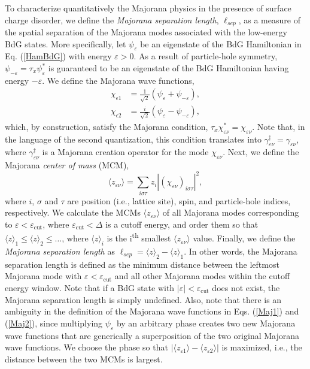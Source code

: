 \documentclass[aps,prmaterials,twocolumn,superscriptaddress,longbibliography]{revtex4-2}
\begin{document}
To characterize quantitatively the Majorana physics in the presence of surface charge disorder, we define the \textit{Majorana separation length}, $\ell_{sep}$, as a measure of the spatial separation of the Majorana modes associated with the low-energy BdG states. More specifically, let $\psi_\varepsilon$ be an eigenstate of the BdG Hamiltonian in Eq. (\ref{HamBdG}) with energy $\varepsilon > 0$. As a result of particle-hole symmetry, $\psi_{-\varepsilon} = \tau_x \psi_{\varepsilon}^*$ is guaranteed to be an eigenstate of the BdG Hamiltonian having energy $-\varepsilon$. We define the Majorana wave functions, 
\begin{align}
    \chi_{\epsilon1} &= \frac{1}{\sqrt{2}} \left(
    \psi_\varepsilon + \psi_{-\varepsilon}\right), \label{Maj1} \\
    \chi_{\epsilon2} &= \frac{i}{\sqrt{2}} \left(
    \psi_\varepsilon - \psi_{-\varepsilon}\right), \label{Maj2}
\end{align}
which, by construction, satisfy the Majorana condition, $\tau_x \chi_{\varepsilon \nu}^* = \chi_{\varepsilon \nu}$. Note that, in the language of the second quantization, this condition translates into $\gamma_{\varepsilon \nu}^\dagger = \gamma_{\varepsilon \nu}$, where $\gamma_{\varepsilon \nu}^\dagger$ is a Majorana creation operator for the mode $\chi_{\varepsilon \nu}$. Next, we define the Majorana {\em center of mass} (MCM), 
\begin{equation}
    \langle z_{\varepsilon \nu} \rangle = 
    \sum_{i \sigma \tau} z_i \left|
    \left(\chi_{\varepsilon \nu}\right)_{i \sigma \tau}
    \right|^2,
\end{equation}
where $i$, $\sigma$ and $\tau$ are position (i.e., lattice site), spin, and particle-hole indices, respectively. We calculate the MCMs $\langle z_{\varepsilon \nu} \rangle$ of all Majorana modes corresponding to $\varepsilon < \varepsilon_{\text{cut}}$, where $\varepsilon_{\text{cut}}<\Delta$ is a cutoff energy, and order them so that $\langle z\rangle_1 \leq \langle z\rangle_2 \leq \dots$, where $\langle z \rangle_i$ is the i\textsuperscript{th} smallest $\langle z_{\varepsilon \nu} \rangle$ value. Finally, we define the \textit{Majorana separation length} as $\ell_{sep} = \langle z \rangle_2 - \langle z \rangle_1$. In other words, the Majorana separation length is defined as the minimum distance between the leftmost Majorana mode with $\varepsilon < \varepsilon_\text{cut}$ and all other Majorana modes within the cutoff energy window. Note that if a BdG state with $|\varepsilon| < \varepsilon_\text{cut}$ does not exist, the Majorana separation length is simply undefined. 
Also, note that there is an ambiguity in the definition of the Majorana wave functions in Eqs. (\ref{Maj1}) and (\ref{Maj2}), since multiplying $\psi_{\varepsilon}$ by an arbitrary phase creates two new Majorana wave functions that are generically a superposition of the two original Majorana wave functions. We choose the phase so that $|\langle z_{\varepsilon 1} \rangle - \langle z_{\varepsilon 2} \rangle|$ is maximized, i.e., the distance between the two MCMs is largest. 
\end{document}
